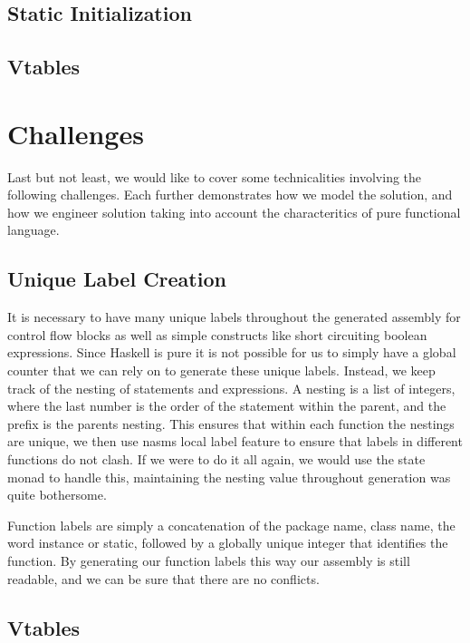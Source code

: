 \documentclass[12pt,letterpaper]{article}
\begin{document}
\subsection{Static Initialization}

\subsection{Vtables}

\section{Challenges}
Last but not least, we would like to cover some technicalities involving the following challenges. Each further demonstrates how we model the solution, and how we engineer solution taking into account the characteritics of pure functional language.

\subsection{Unique Label Creation}
It is necessary to have many unique labels throughout the generated assembly for control flow blocks as well as simple constructs like short circuiting boolean expressions.
Since Haskell is pure it is not possible for us to simply have a global counter that we can rely on to generate these unique labels.
Instead, we keep track of the nesting of statements and expressions.
A nesting is a list of integers, where the last number is the order of the statement within the parent, and the prefix is the parents nesting.
This ensures that within each function the nestings are unique, we then use nasms local label feature to ensure that labels in different functions do not clash.
If we were to do it all again, we would use the state monad to handle this, maintaining the nesting value throughout generation was quite bothersome.

Function labels are simply a concatenation of the package name, class name, the word instance or static, followed by a globally unique integer that identifies the function.
By generating our function labels this way our assembly is still readable, and we can be sure that there are no conflicts.
\subsection{Vtables}
\end{document}
